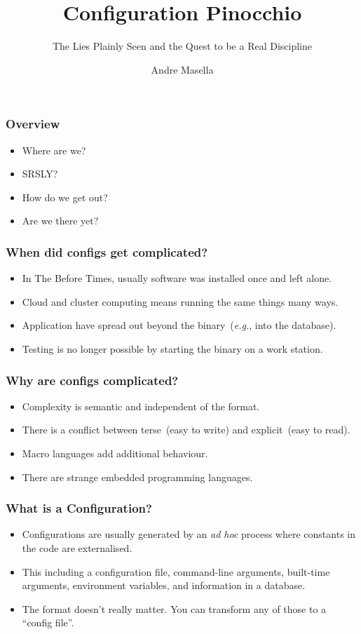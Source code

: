 \documentclass{beamer}
\title{Configuration Pinocchio}
\subtitle{The Lies Plainly Seen and the Quest to be a Real Discipline}
\author{Andre Masella}
\begin{document}
\begin{frame}\maketitle \end{frame}

\begin{frame}\frametitle{Overview}
\begin{itemize}
\item Where are we?
\item SRSLY?
\item How do we get out?
\item Are we there yet?
\end{itemize}
\end{frame}

\begin{frame}\frametitle{When did configs get complicated?}
\begin{itemize}
\item In The Before Times, usually software was installed once and left alone.
\item Cloud and cluster computing means running the same things many ways.
\item Application have spread out beyond the binary~(\emph{e.g.}, into the database).
\item Testing is no longer possible by starting the binary on a work station.
\end{itemize}
\end{frame}

\begin{frame}\frametitle{Why are configs complicated?}
\begin{itemize}
\item Complexity is semantic and independent of the format.
\item There is a conflict between terse~(easy to write) and explicit~(easy to read).
\item Macro languages add additional behaviour.
\item There are strange embedded programming languages.
\end{itemize}
\end{frame}

\begin{frame}\frametitle{What is a Configuration?}
\begin{itemize}
\item Configurations are usually generated by an \emph{ad hoc} process where constants in the code are externalised.
\item This including a configuration file, command-line arguments, built-time arguments, environment variables, and information in a database.
\item The format doesn't really matter. You can transform any of those to a ``config file''.
\end{itemize}
\end{frame}
\end{document}
